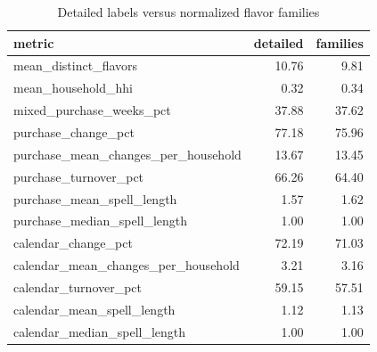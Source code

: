 \begin{table}
\caption{Detailed labels versus normalized flavor families}
\begin{tabular}{lrr}
\toprule
metric & detailed & families \\
\midrule
mean\_distinct\_flavors & 10.76 & 9.81 \\
mean\_household\_hhi & 0.32 & 0.34 \\
mixed\_purchase\_weeks\_pct & 37.88 & 37.62 \\
purchase\_change\_pct & 77.18 & 75.96 \\
purchase\_mean\_changes\_per\_household & 13.67 & 13.45 \\
purchase\_turnover\_pct & 66.26 & 64.40 \\
purchase\_mean\_spell\_length & 1.57 & 1.62 \\
purchase\_median\_spell\_length & 1.00 & 1.00 \\
calendar\_change\_pct & 72.19 & 71.03 \\
calendar\_mean\_changes\_per\_household & 3.21 & 3.16 \\
calendar\_turnover\_pct & 59.15 & 57.51 \\
calendar\_mean\_spell\_length & 1.12 & 1.13 \\
calendar\_median\_spell\_length & 1.00 & 1.00 \\
\bottomrule
\end{tabular}
\end{table}
